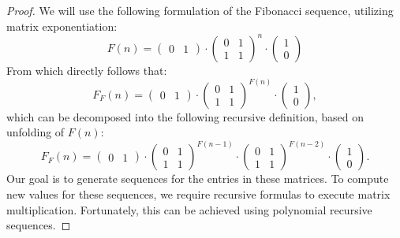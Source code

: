 \documentclass[en]{pracamgr}
\theoremstyle{definition}
\begin{document}
\begin{proof}
    We will use the following formulation of the Fibonacci sequence, utilizing matrix exponentiation:
    $$F(n) = 
    \begin{pmatrix}
        0 & 1 
    \end{pmatrix}
    \cdot
    \begin{pmatrix}
        0 & 1\\ 
        1 & 1
    \end{pmatrix}^n
    \cdot
    \begin{pmatrix}
        1 \\
        0 
    \end{pmatrix}
    $$
    From which directly follows that:
    $$F_F(n) = 
    \begin{pmatrix}
        0 & 1 
    \end{pmatrix}
    \cdot
    \begin{pmatrix}
        0 & 1\\ 
        1 & 1
    \end{pmatrix}^{F(n)}
    \cdot
    \begin{pmatrix}
        1 \\
        0 
    \end{pmatrix},
    $$
    which can be decomposed into the following recursive definition, based on unfolding of $F(n)$:
    $$F_F(n) = 
    \begin{pmatrix}
        0 & 1 
    \end{pmatrix}
    \cdot
    \begin{pmatrix}
        0 & 1\\ 
        1 & 1
    \end{pmatrix}^{F(n-1)}
    \cdot
    \begin{pmatrix}
        0 & 1\\ 
        1 & 1
    \end{pmatrix}^{F(n-2)}
    \cdot
    \begin{pmatrix}
        1 \\
        0 
    \end{pmatrix}.
    $$
    Our goal is to generate sequences for the entries in these matrices. To compute new values for these sequences, we require recursive formulas to execute matrix multiplication. Fortunately, this can be achieved using polynomial recursive sequences.


\end{proof}
\end{document}
